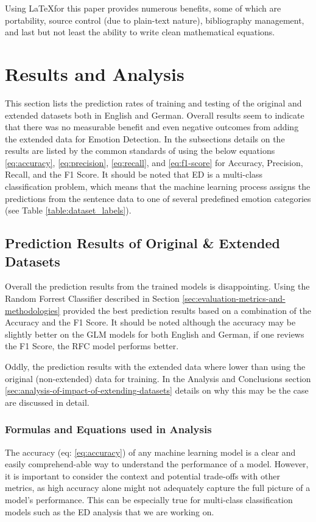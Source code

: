 \documentclass[11pt]{article}
\begin{document}
Using \LaTeX\;for this paper provides numerous benefits, some of which are portability, source control (due to plain-text nature), bibliography management, and last but not least the ability to write clean mathematical equations. 

\clearpage
\section{Results and Analysis}
\label{sec:results-and-analysis}
This section lists the prediction rates of training and testing of the original and extended datasets both in English and German. Overall results seem to indicate that there was no measurable benefit and even negative outcomes from adding the extended data for Emotion Detection. In the subsections details on the results are listed by the common standards of using the below equations \ref{eq:accuracy}, \ref{eq:precision}, \ref{eq:recall}, and \ref{eq:f1-score} for Accuracy, Precision, Recall, and the F1 Score. It should be noted that ED is a multi-class classification problem, which means that the machine learning process assigns the predictions from the sentence data to one of several predefined emotion categories (see Table \ref{table:dataset_labels}).

\subsection{Prediction Results of Original \& Extended Datasets}
Overall the prediction results from the trained models is disappointing. Using the Random Forrest Classifier described in Section \ref{sec:evaluation-metrics-and-methodologies} provided the best prediction results based on a combination of the Accuracy and the F1 Score. It should be noted although the accuracy may be slightly better on the GLM models for both English and German, if one reviews the F1 Score, the RFC model performs better.

Oddly, the prediction results with the extended data where lower than using the original (non-extended) data for training. In the Analysis and Conclusions section \ref{sec:analysis-of-impact-of-extending-datasets} details on why this may be the case are discussed in detail.

\subsubsection{Formulas and Equations used in Analysis}
The accuracy (eq: \ref{eq:accuracy}) of any machine learning model is a clear and easily comprehend-able way to understand the performance of a model. However, it is important to consider the context and potential trade-offs with other metrics, as high accuracy alone might not adequately capture the full picture of a model's performance. This can be especially true for multi-class classification models such as the ED analysis that we are working on.
\end{document}
